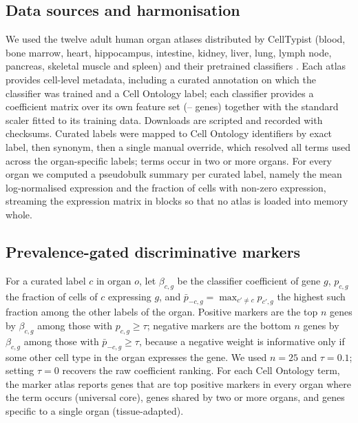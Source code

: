 \documentclass[11pt]{article}
\begin{document}
\subsection{Data sources and harmonisation}

We used the twelve adult human organ atlases distributed by CellTypist (blood, bone marrow, heart, hippocampus, intestine, kidney, liver, lung, lymph node, pancreas, skeletal muscle and spleen) and their pretrained classifiers \cite{xu2023,celltypistorgans}. Each atlas provides cell-level metadata, including a curated annotation on which the classifier was trained and a Cell Ontology label; each classifier provides a coefficient matrix over its own feature set (\minModelGenes{}--\maxModelGenes{} genes) together with the standard scaler fitted to its training data. Downloads are scripted and recorded with checksums. Curated labels were mapped to Cell Ontology identifiers \cite{diehl2016} by exact label, then synonym, then a single manual override, which resolved all \nCLTerms{} terms used across the \nLabels{} organ-specific labels; \nMultiOrganTerms{} terms occur in two or more organs. For every organ we computed a pseudobulk summary per curated label, namely the mean log-normalised expression and the fraction of cells with non-zero expression, streaming the expression matrix in blocks so that no atlas is loaded into memory whole.

\subsection{Prevalence-gated discriminative markers}

For a curated label $c$ in organ $o$, let $\beta_{c,g}$ be the classifier coefficient of gene $g$, $p_{c,g}$ the fraction of cells of $c$ expressing $g$, and $\bar p_{-c,g} = \max_{c' \neq c} p_{c',g}$ the highest such fraction among the other labels of the organ. Positive markers are the top $n$ genes by $\beta_{c,g}$ among those with $p_{c,g} \geq \tau$; negative markers are the bottom $n$ genes by $\beta_{c,g}$ among those with $\bar p_{-c,g} \geq \tau$, because a negative weight is informative only if some other cell type in the organ expresses the gene. We used $n = 25$ and $\tau = 0.1$; setting $\tau = 0$ recovers the raw coefficient ranking. For each Cell Ontology term, the marker atlas reports genes that are top positive markers in every organ where the term occurs (universal core), genes shared by two or more organs, and genes specific to a single organ (tissue-adapted).
\end{document}
